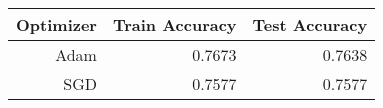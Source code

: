\begin{tabular}{|r||r|r|}
\hline
Optimizer & Train Accuracy & Test Accuracy \\
\hline
Adam & 0.7673 & 0.7638 \\
SGD & 0.7577 & 0.7577 \\
\hline
\end{tabular}
